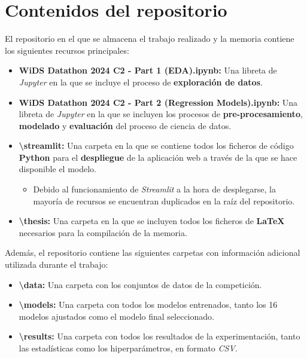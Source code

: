 \chapter{Contenidos del repositorio}

El repositorio en el que se almacena el trabajo realizado y la memoria contiene los siguientes recursos principales:

\begin{itemize}[leftmargin=*]
	\item \textbf{WiDS Datathon 2024 C2 - Part 1 (EDA).ipynb:} Una libreta de \textit{Jupyter} en la que se incluye el proceso de \textbf{exploración de datos}.
	\item \textbf{WiDS Datathon 2024 C2 - Part 2 (Regression Models).ipynb:} Una libreta de \textit{Jupyter} en la que se incluyen los procesos de \textbf{pre-procesamiento}, \textbf{modelado} y \textbf{evaluación} del proceso de ciencia de datos.
	\item \textbf{\textbackslash streamlit:} Una carpeta en la que se contiene todos los ficheros de código \textbf{Python} para el \textbf{despliegue} de la aplicación web a través de la que se hace disponible el modelo.
	\begin{itemize}
		\item Debido al funcionamiento de \textit{Streamlit} a la hora de desplegarse, la mayoría de recursos se encuentran duplicados en la raíz del repositorio.
	\end{itemize}
	\item  \textbf{\textbackslash thesis:} Una carpeta en la que se incluyen todos los ficheros de \textbf{LaTeX} necesarios para la compilación de la memoria.
		
		
\end{itemize}

Además, el repositorio contiene las siguientes carpetas con información adicional utilizada durante el trabajo:

\begin{itemize}[leftmargin=*]
	\item \textbf{\textbackslash data:} Una carpeta con los conjuntos de datos de la competición.
	\item \textbf{\textbackslash models:} Una carpeta con todos los modelos entrenados, tanto los 16 modelos ajustados como el modelo final seleccionado.
	\item \textbf{\textbackslash results:} Una carpeta con todos los resultados de la experimentación, tanto las estadísticas como los hiperparámetros, en formato \textit{CSV}.
\end{itemize}